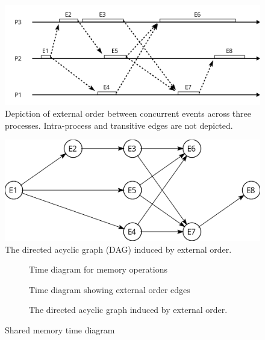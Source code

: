 \documentclass[]             %
{NASA}                       %
\theoremstyle{definition}
\begin{document}
\begin{figure}[p]
  \center
  \includegraphics[scale=0.4]{images/externalorder.png}
  \caption{Depiction of external order between concurrent events across three processes. Intra-process and transitive edges are not depicted.}
  \label{fig:externalorderexec}
\end{figure}

\begin{figure}[p]
    \center
    \includegraphics[scale=0.25]{images/partialorder.png}
    \caption{The directed acyclic graph (DAG) induced by external order.}
    \label{fig:externalorderdag}
\end{figure}

\newpage

\begin{figure}[p]
  \setlength\belowcaptionskip{5ex}

  \begin{subfigure}{1\textwidth}
    \centering
    
    \caption{Time diagram for memory operations}
    \label{fig:external1}
  \end{subfigure}

  \begin{subfigure}{1\textwidth}
    \centering 
    \caption{Time diagram showing external order edges}
    \label{fig:external2}
  \end{subfigure}

  \begin{subfigure}{1\textwidth}
    \centering 
    \caption{The directed acyclic graph induced by external order.}
    \label{fig:externalDAG}
  \end{subfigure}

  \caption{Shared memory time diagram}
  \label{fig:external}
\end{figure}
\end{document}
